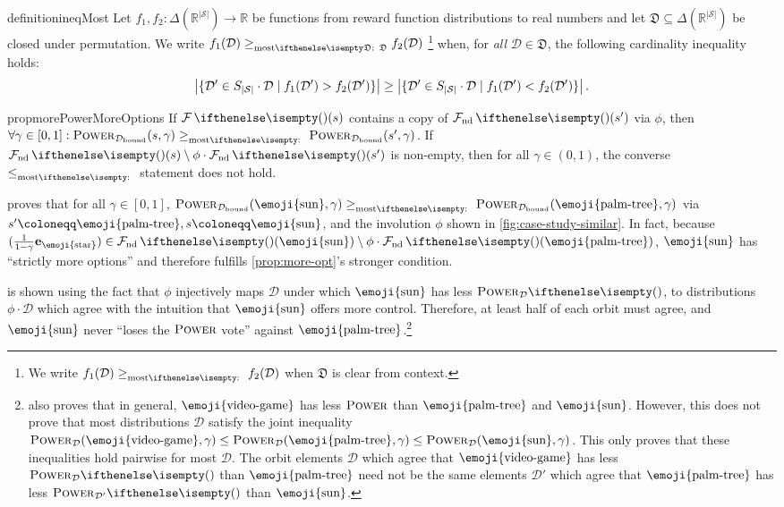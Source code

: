 \documentclass{article}
\renewcommand{\abs}[1]{\left|#1\right|}
\newcommand*{\defeq}{\coloneqq} %
\newcommand*{\reals}{\mathbb{R}}
\newcommand*{\unitvec}[1][s]{\mathbf{e}_{#1}}
\newcommand*{\St}{\mathcal{S}}
\newcommand*{\rewardVS}{\reals^{\abs{\St}}} %
\newcommand*{\D}{\mathcal{D}} %
\newcommand*{\distSet}{\mathfrak{D}}
\newcommand*{\Dbd}{\D_{\text{bound}}}
\newcommand*{\geom}[1][1]{\frac{#1}{1-\gamma}}
\theoremstyle{definition}
\newcommand*{\sink}{\text{\emoji{video-game}}}
\newcommand*{\farleft}{\text{\emoji{palm-tree}}}
\newcommand*{\topright}{\text{\emoji{star}}}
\newcommand*{\farright}{\text{\emoji{sun}}}
\newcommand*{\sink}{\varnothing}
\newcommand*{\farleft}{\ell_{\swarrow}}
\newcommand*{\topright}{r_{\nearrow}}
\newcommand*{\farright}{r_{\searrow}}
\begin{document}
\begin{restatable}{definition}{ineqMost}\label{def:ineq-most-dists}
Let $f_1,f_2:\Delta(\rewardVS)\to \reals$ be functions from reward function distributions to real numbers and let $\distSet\subseteq \Delta(\rewardVS)$ be closed under permutation. We write $f_1(\D)\geqMost[][\distSet] f_2(\D)$
\footnote{We write $f_1(\D)\geqMost[][] f_2(\D)$ when $\distSet$ is clear from context.} when, for \emph{all} $\D\in \distSet$, the following cardinality inequality holds:
\begin{equation}
\abs{\{\D' \in\orbi[\D]\mid f_1(\D')>f_2(\D')\}}\geq \abs{\{\D'\in\orbi[\D]\mid f_1(\D')<f_2(\D')\}}.
\end{equation}
\end{restatable} 

\begin{restatable}{prop}{morePowerMoreOptions}\label{prop:more-opt}
If $\F(s)$ contains a copy of $\Fnd(s')$ via $\phi$, then $\forall \gamma\in[0,1]:\pwrNoResize[s,\gamma][\Dbd]\geqMost[][] \pwrNoResize[s',\gamma][\Dbd]$. If $\Fnd(s)\setminus \phi\cdot \Fnd(s')$ is non-empty, then for all $\gamma\in(0,1)$, the converse $\leqMost[][]$ statement does not hold.
\end{restatable}

 proves that for all $\gamma\in[0,1]$, $\pwrNoResize[\farright,\gamma][\Dbd]\geqMost[][] \pwrNoResize[\farleft,\gamma][\Dbd]$ via $s'\defeq \farleft,s\defeq \farright$, and the involution $\phi$ shown in \cref{fig:case-study-similar}. In fact, because $(\geom\unitvec[\topright])\in \Fnd(\farright)\setminus \phi\cdot\Fnd(\farleft)$, $\farright$ has ``strictly more options'' and therefore fulfills \cref{prop:more-opt}'s stronger condition. 
 
 is shown using the fact that $\phi$ injectively maps $\D$ under which $\farright$ has less $\pwr[][\D]$, to distributions $\phi\cdot\D$ which agree with the intuition that $\farright$ offers more control. Therefore, at least half of each orbit must agree, and $\farright$ never ``loses the $\text{\upshape\textsc{Power}}$ vote'' against $\farleft$.\footnote{ also proves that in general, $\sink$ has less $\text{\upshape\textsc{Power}}$ than $\farleft$ and $\farright$. However, this does not prove that most distributions $\D$ satisfy the joint inequality $\pwrNoResize[\sink,\gamma][\D]\leq\pwrNoResize[\farleft,\gamma][\D]\leq \pwrNoResize[\farright,\gamma][\D]$. This only proves that these inequalities hold pairwise for most $\D$. The orbit elements $\D$ which agree that $\sink$ has less $\pwr[][\D]$ than $\farleft$ need not be the same elements $\D'$ which agree that $\farleft$ has less $\pwr[][\D']$ than $\farright$.} 
\end{document}
